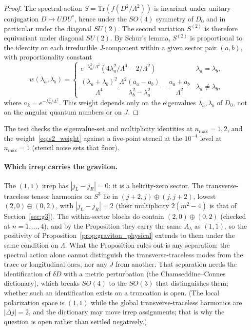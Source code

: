 \documentclass[11pt,a4paper]{article}
\theoremstyle{plain}
\theoremstyle{definition}
\newcommand{\sthree}{S^{3}}
\renewcommand{\_}{\textunderscore\allowbreak}
\begin{document}
\begin{proof}
The spectral action $S = \mathrm{Tr}(f(D^2/\Lambda^2))$ is invariant
under unitary conjugation $D \mapsto UDU^*$, hence under the
$SO(4)$ symmetry of $D_0$ and in particular under the diagonal
$SU(2)$. The second variation $S^{(2)}$ is therefore equivariant
under diagonal $SU(2)$. By Schur's lemma, $S^{(2)}$ is proportional
to the identity on each irreducible $J$-component within a given
sector pair $(a, b)$, with proportionality constant
\begin{equation}
  w(\lambda_a, \lambda_b) =
  \begin{cases}
    e^{-\lambda_a^2/\Lambda^2}
    (4\lambda_a^2/\Lambda^4 - 2/\Lambda^2)
    & \lambda_a = \lambda_b, \\[4pt]
    \dfrac{(\lambda_a + \lambda_b)^2}{\Lambda^4}\,
    \dfrac{\Lambda^2(a_a - a_b)}{\lambda_b^2 - \lambda_a^2}
    - \dfrac{a_a + a_b}{\Lambda^2}
    & \lambda_a \neq \lambda_b,
  \end{cases}
  \label{eq:s2_weight}
\end{equation}
where $a_k = e^{-\lambda_k^2/\Lambda^2}$. This weight depends only on
the eigenvalues $\lambda_a, \lambda_b$ of $D_0$, not on the angular
quantum numbers or on $J$.
\end{proof}

The test checks the eigenvalue-set and multiplicity identities at
$n_{\max} = 1, 2$, and the weight~\eqref{eq:s2_weight} against a five-point
stencil at the $10^{-4}$ level at $n_{\max} = 1$ (stencil noise sets that
floor).

\paragraph{Which irrep carries the graviton.} The $(1,1)$ irrep has
$|j_L - j_R| = 0$: it is a helicity-zero sector. The transverse-traceless
tensor harmonics on $\sthree$ lie in $(j{+}2, j) \oplus (j, j{+}2)$, lowest
$(2,0)\oplus(0,2)$, with $|j_L - j_R| = 2$ (their multiplicity
$2(m^2 - 4)$ is that of Section~\ref{sec:g3}). The within-sector blocks do
contain $(2,0)\oplus(0,2)$ (checked at $n = 1, \dots, 4$), and by the
Proposition they carry the same $A_\lambda$ as $(1,1)$, so the positivity
of Proposition~\ref{prop:graviton_physical} extends to them under the same
condition on $\Lambda$. What the Proposition rules out is any separation:
the spectral action alone cannot distinguish the transverse-traceless
modes from the trace or longitudinal ones, nor any $J$ from another. That
separation needs the identification of $\delta D$ with a metric
perturbation (the Chamseddine--Connes dictionary), which breaks $SO(4)$ to
the $SO(3)$ that distinguishes them; whether such an identification exists
on a truncation is open. (The local polarization space is $(1,1)$ while
the global transverse-traceless harmonics are $|\Delta j| = 2$, and the
dictionary may move irrep assignments; that is why the question is open
rather than settled negatively.)
\end{document}
